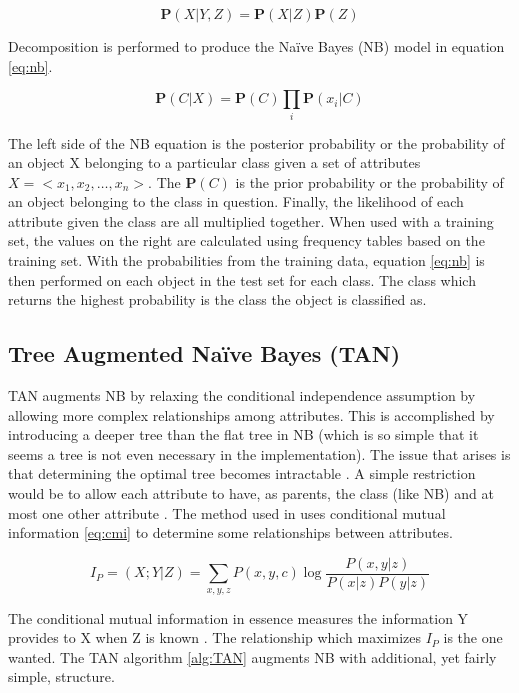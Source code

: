\begin{equation}\label{eq:ci}
	\boldsymbol P(X | Y, Z) = \boldsymbol P(X | Z) \boldsymbol P(Z)
\end{equation}

Decomposition is performed to produce the Na\"ive Bayes (NB) model in equation \ref{eq:nb}.

\begin{equation}\label{eq:nb}
	\boldsymbol P (C | X) = \boldsymbol P(C) \prod_{i} \boldsymbol P(x_i | C)
\end{equation}

The left side of the NB equation is the posterior probability or the probability of an object X belonging to a particular class given a set of attributes $X = <x_1, x_2, \ldots, x_n>$. 
The $\boldsymbol P(C)$ is the prior probability or the probability of an object belonging to the class in question.
Finally, the likelihood of each attribute given the class are all multiplied together. 
When used with a training set, the values on the right are calculated using frequency tables based on the training set.
With the probabilities from the training data, equation \ref{eq:nb} is then performed on each object in the test set for each class. 
The class which returns the highest probability is the class the object is classified as.

\subsection{Tree Augmented Na\"{i}ve Bayes (TAN)}
TAN \cite{Friedman} augments NB by relaxing the conditional independence assumption by allowing more complex relationships among attributes. 
This is accomplished by introducing a deeper tree than the flat tree in NB (which is so simple that it seems a tree is not even necessary in the implementation). 
The issue that arises is that determining the optimal tree becomes intractable \cite{Friedman}. 
A simple restriction would be to allow each attribute to have, as parents, the class (like NB) and at most one other attribute \cite{Friedman}. 
The method used in \cite{Friedman} uses conditional mutual information \ref{eq:cmi} to determine some relationships between attributes.

\begin{equation}\label{eq:cmi}
	I_P = (X; Y | Z) = \sum_{x, y, z} P(x, y, c) \log \frac{P(x, y | z)}{P(x | z) P(y | z)}
\end{equation}

The conditional mutual information in essence measures the information Y provides to X when Z is known \cite{Friedman}. The relationship which maximizes $I_P$ is the one wanted. The TAN algorithm \ref{alg:TAN} augments NB with additional, yet fairly simple, structure.

